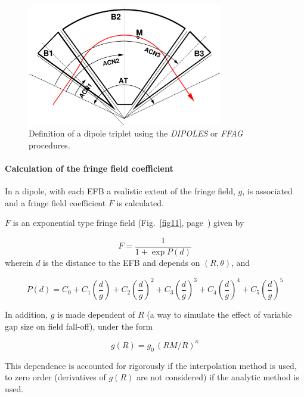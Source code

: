 \begin{figure}[h]
 \begin{center}
\includegraphics[width=8.5cm]{ffagTriplet.eps}  
 \caption{ \label{figDFD}
Definition of a dipole triplet using  the \textsl{DIPOLES} or  \textsl{FFAG}  procedures. 
}
  \end{center}
\end{figure}





\paragraph{Calculation of the fringe field coefficient} 

\noindent In a dipole, with  each EFB a realistic extent of the fringe field, $g $, 
is associated and a fringe field coefficient $ F $ is calculated. 


\bigskip

\noindent$ F $ is an exponential type fringe field (Fig.~\ref{fig11}, page~\pageref{fig11}) 
given by~\cite{Biblio12}     %

$$ F = \frac{1 }{ 1+ \exp P(d)} $$
%
 wherein $ d $ is the distance to the EFB and depends on $(R,\theta)$, and 

$$
    P(d) = C_0
       +C_1 \left(  \dfrac{d }{ g } \right) 
       +C_2 \left( \dfrac{d }{ g } \right)^2 
       + C_3 \left( \dfrac{d }{ g } \right)^3 
       +C_4 \left( \dfrac{d }{ g } \right)^4 
       + C_5 \left(\dfrac{d }{ g } \right)^5 $$

\noindent In addition,   $g$ is made dependent  of $R$ 
(a way to simulate the effect of variable gap size on field fall-off), 
under the form 

$$ g(R) = g_0 \, (RM/R)^{\kappa}  $$

This dependence is accounted for rigorously if the interpolation method is 
used, to zero order (derivatives of $g(R)$ are not considered) if the analytic method is used. 

